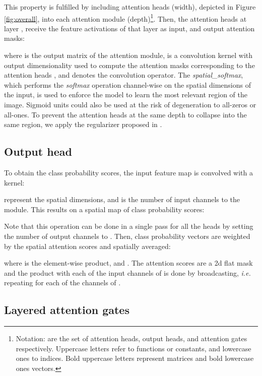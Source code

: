 \documentclass[runningheads]{llncs}
\begin{document}
This property is fulfilled by including  attention heads  (width), depicted in Figure \ref{fig:overall}, into each attention module (depth)\footnote{Notation:  are the set of attention heads, output heads, and attention gates respectively. Uppercase letters refer to functions or constants, and lowercase ones to indices. Bold uppercase letters represent matrices and bold lowercase ones vectors.}. Then, the attention heads at layer , receive the feature activations  of that layer as input, and output  attention masks:



where  is the output matrix of the  attention module,  is a convolution kernel with output dimensionality  used to compute the attention masks corresponding to the attention heads , and  denotes the convolution operator. The \emph{spatial\_softmax}, which performs the \emph{softmax} operation channel-wise on the spatial dimensions of the input, is used to enforce the model to learn the most relevant region of the image. Sigmoid units could also be used at the risk of degeneration to all-zeros or all-ones. To prevent the attention heads at the same depth to collapse into the same region, we apply the regularizer proposed in \cite{zhao2017diversified}.

\subsection{Output head}
To obtain the class probability scores, the input feature map    is convolved with a kernel:



 represent the spatial dimensions, and  is the number of input channels to the module. This results on a spatial map of class probability scores:



Note that this operation can be done in a single pass for all the  heads by setting the number of output channels to . Then, class probability vectors  are weighted by the spatial attention scores and spatially averaged:



where  is the element-wise product, and . The attention scores  are a 2d flat mask and the product with each of the input channels of  is done by broadcasting, \emph{i.e.} repeating  for each of the channels  of .

\subsection{Layered attention gates}
\end{document}
